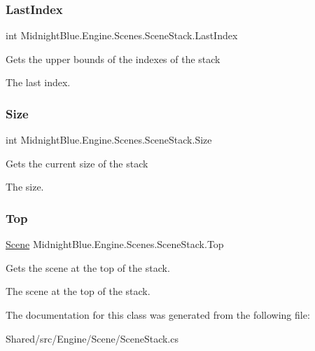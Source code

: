 \subsubsection{\texorpdfstring{Last\+Index}{LastIndex}}
{\footnotesize\ttfamily int Midnight\+Blue.\+Engine.\+Scenes.\+Scene\+Stack.\+Last\+Index\hspace{0.3cm}{\ttfamily [get]}}



Gets the upper bounds of the indexes of the stack 

The last index.\hypertarget{class_midnight_blue_1_1_engine_1_1_scenes_1_1_scene_stack_aa53bbf44549a6642076a045c86c91dfa}{}\label{class_midnight_blue_1_1_engine_1_1_scenes_1_1_scene_stack_aa53bbf44549a6642076a045c86c91dfa} 
\subsubsection{\texorpdfstring{Size}{Size}}
{\footnotesize\ttfamily int Midnight\+Blue.\+Engine.\+Scenes.\+Scene\+Stack.\+Size\hspace{0.3cm}{\ttfamily [get]}}



Gets the current size of the stack 

The size.\hypertarget{class_midnight_blue_1_1_engine_1_1_scenes_1_1_scene_stack_ac4f2a2f4f02a64f942724d84b93147fe}{}\label{class_midnight_blue_1_1_engine_1_1_scenes_1_1_scene_stack_ac4f2a2f4f02a64f942724d84b93147fe} 
\subsubsection{\texorpdfstring{Top}{Top}}
{\footnotesize\ttfamily \hyperlink{class_midnight_blue_1_1_engine_1_1_scenes_1_1_scene}{Scene} Midnight\+Blue.\+Engine.\+Scenes.\+Scene\+Stack.\+Top\hspace{0.3cm}{\ttfamily [get]}}



Gets the scene at the top of the stack. 

The scene at the top of the stack.

The documentation for this class was generated from the following file\+:\begin{DoxyCompactItemize}
\item 
Shared/src/\+Engine/\+Scene/Scene\+Stack.\+cs\end{DoxyCompactItemize}
